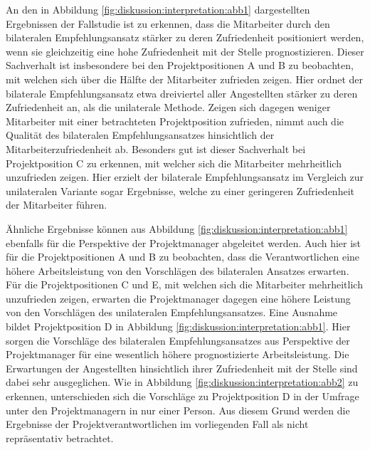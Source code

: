 An den in Abbildung \ref{fig:diskussion:interpretation:abb1} dargestellten Ergebnissen der Fallstudie ist zu erkennen, dass die Mitarbeiter durch den bilateralen Empfehlungsansatz stärker zu deren Zufriedenheit positioniert werden, wenn sie gleichzeitig eine hohe Zufriedenheit mit der Stelle prognostizieren. Dieser Sachverhalt ist insbesondere bei den Projektpositionen A und B zu beobachten, mit welchen sich über die Hälfte der Mitarbeiter zufrieden zeigen. Hier ordnet der bilaterale Empfehlungsansatz etwa dreiviertel aller Angestellten stärker zu deren Zufriedenheit an, als die unilaterale Methode. Zeigen sich dagegen weniger Mitarbeiter mit einer betrachteten Projektposition zufrieden, nimmt auch die Qualität des bilateralen Empfehlungsansatzes hinsichtlich der Mitarbeiterzufriedenheit ab. Besonders gut ist dieser Sachverhalt bei Projektposition C zu erkennen, mit welcher sich die Mitarbeiter mehrheitlich unzufrieden zeigen. Hier erzielt der bilaterale Empfehlungsansatz im Vergleich zur unilateralen Variante sogar Ergebnisse, welche zu einer geringeren Zufriedenheit der Mitarbeiter führen.

Ähnliche Ergebnisse können aus Abbildung \ref{fig:diskussion:interpretation:abb1} ebenfalls für die Perspektive der Projektmanager abgeleitet werden. Auch hier ist für die Projektpositionen A und B zu beobachten, dass die Verantwortlichen eine höhere Arbeitsleistung von den Vorschlägen des bilateralen Ansatzes erwarten. Für die Projektpositionen C und E, mit welchen sich die Mitarbeiter mehrheitlich unzufrieden zeigen, erwarten die Projektmanager dagegen eine höhere Leistung von den Vorschlägen des unilateralen Empfehlungsansatzes. Eine Ausnahme bildet Projektposition D in Abbildung \ref{fig:diskussion:interpretation:abb1}. Hier sorgen die Vorschläge des bilateralen Empfehlungsansatzes aus Perspektive der Projektmanager für eine wesentlich höhere prognostizierte Arbeitsleistung. Die Erwartungen der Angestellten hinsichtlich ihrer Zufriedenheit mit der Stelle sind dabei sehr ausgeglichen. Wie in Abbildung \ref{fig:diskussion:interpretation:abb2} zu erkennen, unterschieden sich die Vorschläge zu Projektposition D in der Umfrage unter den Projektmanagern in nur einer Person. Aus diesem Grund werden die Ergebnisse der Projektverantwortlichen im vorliegenden Fall als nicht repräsentativ betrachtet.


